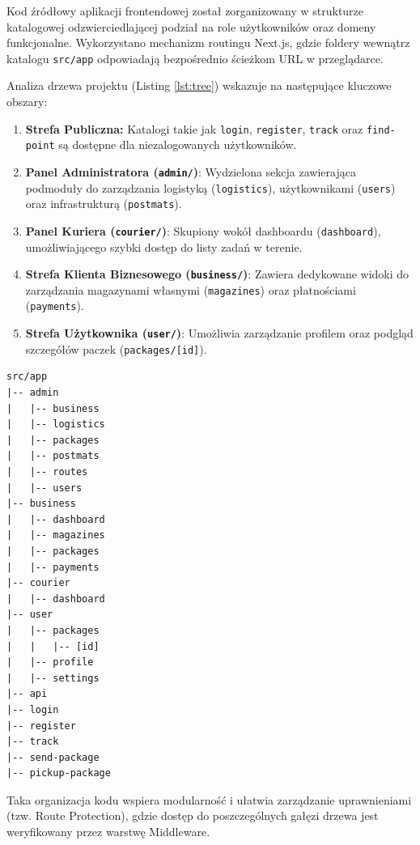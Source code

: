 Kod źródłowy aplikacji frontendowej został zorganizowany w strukturze katalogowej odzwierciedlającej podział na role użytkowników oraz domeny funkcjonalne. Wykorzystano mechanizm routingu Next.js, gdzie foldery wewnątrz katalogu \texttt{src/app} odpowiadają bezpośrednio ścieżkom URL w przeglądarce.

Analiza drzewa projektu (Listing \ref{lst:tree}) wskazuje na następujące kluczowe obszary:

\begin{enumerate}
    \item \textbf{Strefa Publiczna:} Katalogi takie jak \texttt{login}, \texttt{register}, \texttt{track} oraz \texttt{find-point} są dostępne dla niezalogowanych użytkowników.
    \item \textbf{Panel Administratora (\texttt{admin/})}: Wydzielona sekcja zawierająca podmoduły do zarządzania logistyką (\texttt{logistics}), użytkownikami (\texttt{users}) oraz infrastrukturą (\texttt{postmats}).
    \item \textbf{Panel Kuriera (\texttt{courier/})}: Skupiony wokół dashboardu (\texttt{dashboard}), umożliwiającego szybki dostęp do listy zadań w terenie.
    \item \textbf{Strefa Klienta Biznesowego (\texttt{business/})}: Zawiera dedykowane widoki do zarządzania magazynami własnymi (\texttt{magazines}) oraz płatnościami (\texttt{payments}).
    \item \textbf{Strefa Użytkownika (\texttt{user/})}: Umożliwia zarządzanie profilem oraz podgląd szczegółów paczek (\texttt{packages/[id]}).
\end{enumerate}

\begin{lstlisting}[caption={Struktura katalogów aplikacji frontendowej}, label={lst:tree}]
src/app
|-- admin
|   |-- business
|   |-- logistics
|   |-- packages
|   |-- postmats
|   |-- routes
|   |-- users
|-- business
|   |-- dashboard
|   |-- magazines
|   |-- packages
|   |-- payments
|-- courier
|   |-- dashboard
|-- user
|   |-- packages
|   |   |-- [id]
|   |-- profile
|   |-- settings
|-- api
|-- login
|-- register
|-- track
|-- send-package
|-- pickup-package
\end{lstlisting}

Taka organizacja kodu wspiera modularność i ułatwia zarządzanie uprawnieniami (tzw. Route Protection), gdzie dostęp do poszczególnych gałęzi drzewa jest weryfikowany przez warstwę Middleware.